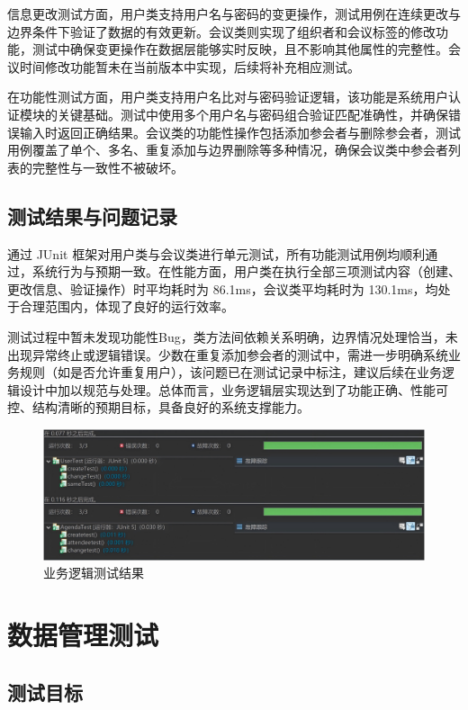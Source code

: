 \documentclass[a4paper, twoside, utf8]{ctexart}
\begin{document}
    信息更改测试方面，用户类支持用户名与密码的变更操作，测试用例在连续更改与边界条件下验证了数据的有效更新。会议类则实现了组织者和会议标签的修改功能，测试中确保变更操作在数据层能够实时反映，且不影响其他属性的完整性。会议时间修改功能暂未在当前版本中实现，后续将补充相应测试。

    在功能性测试方面，用户类支持用户名比对与密码验证逻辑，该功能是系统用户认证模块的关键基础。测试中使用多个用户名与密码组合验证匹配准确性，并确保错误输入时返回正确结果。会议类的功能性操作包括添加参会者与删除参会者，测试用例覆盖了单个、多名、重复添加与边界删除等多种情况，确保会议类中参会者列表的完整性与一致性不被破坏。

    \subsection{测试结果与问题记录}

    通过 JUnit 框架对用户类与会议类进行单元测试，所有功能测试用例均顺利通过，系统行为与预期一致。在性能方面，用户类在执行全部三项测试内容（创建、更改信息、验证操作）时平均耗时为 86.1ms，会议类平均耗时为 130.1ms，均处于合理范围内，体现了良好的运行效率。

    测试过程中暂未发现功能性Bug，类方法间依赖关系明确，边界情况处理恰当，未出现异常终止或逻辑错误。少数在重复添加参会者的测试中，需进一步明确系统业务规则（如是否允许重复用户），该问题已在测试记录中标注，建议后续在业务逻辑设计中加以规范与处理。总体而言，业务逻辑层实现达到了功能正确、性能可控、结构清晰的预期目标，具备良好的系统支撑能力。

    \begin{figure}[htbp]
        \centering
        \includegraphics[width=.9\linewidth]{figure/GeneralTest.png}
        \caption{业务逻辑测试结果}
    \end{figure}

    \section{数据管理测试}

    \subsection{测试目标}
\end{document}
